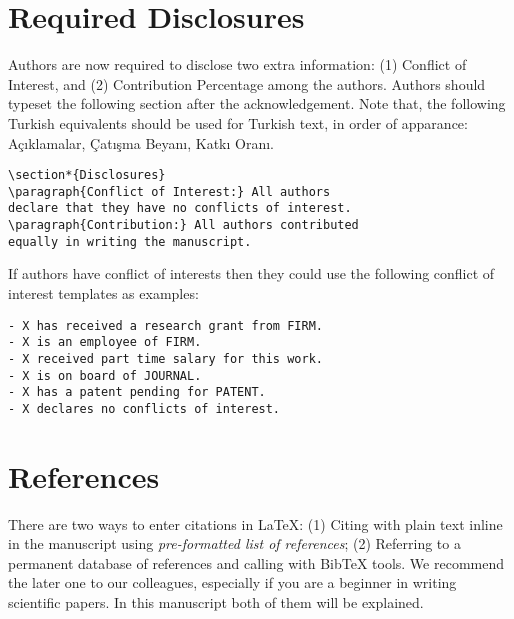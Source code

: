 \documentclass[usenatbib]{tjaa}
\begin{document}
\section{Required Disclosures}
Authors are now required to disclose two extra information: (1) Conflict of
Interest, and (2) Contribution Percentage among the authors. Authors should
typeset the following section after the acknowledgement. Note that, the
following Turkish equivalents should be used for Turkish text, in order of
apparance: Açıklamalar, Çatışma Beyanı, Katkı Oranı.
\begin{verbatim}
\section*{Disclosures}
\paragraph{Conflict of Interest:} All authors
declare that they have no conflicts of interest.
\paragraph{Contribution:} All authors contributed
equally in writing the manuscript.
\end{verbatim}

If authors have conflict of interests then they could use the following
conflict of interest templates as examples:
\begin{verbatim}
- X has received a research grant from FIRM. 
- X is an employee of FIRM.
- X received part time salary for this work.
- X is on board of JOURNAL.
- X has a patent pending for PATENT.
- X declares no conflicts of interest.
\end{verbatim}

\section{References}
\label{refer}

There are two ways to enter citations in \LaTeX{}:
(1) Citing with plain text inline in the manuscript using
\textit{pre-formatted list of references};
(2) Referring to a permanent database of references and calling with BibTeX
tools.
We recommend the later one to our colleagues, especially if you are a beginner
in writing scientific papers.
In this manuscript both of them will be explained.
\end{document}
